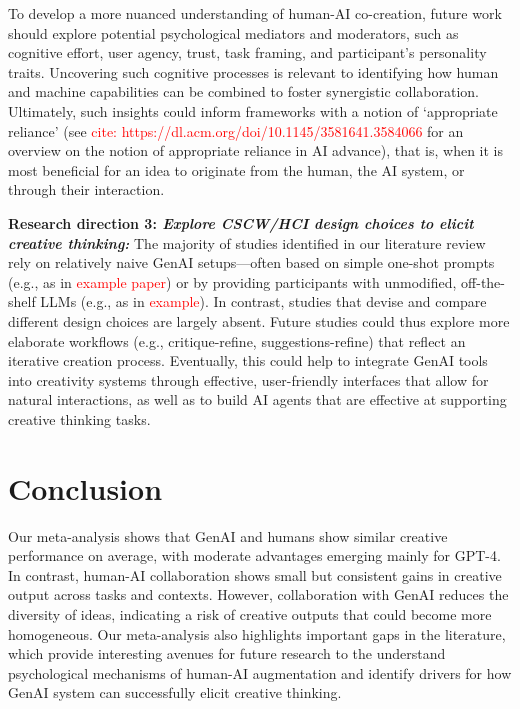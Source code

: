 \documentclass[manuscript, screen, review, acmsmall, anonymous]{acmart}
\newcommand{\TODO}[1]{\textcolor{red}{#1}}
\begin{document}
To develop a more nuanced understanding of human-AI co-creation, future work should explore potential psychological mediators and moderators, such as cognitive effort, user agency, trust, task framing, and participant's personality traits. Uncovering such cognitive processes is relevant to identifying how human and machine capabilities can be combined to foster synergistic collaboration. Ultimately, such insights could inform frameworks with a notion of `appropriate reliance' (see \TODO{cite: https://dl.acm.org/doi/10.1145/3581641.3584066} for an overview on the notion of appropriate reliance in AI advance), that is, when it is most beneficial for an idea to originate from the human, the AI system, or through their interaction.
    
\textbf{Research direction 3: \textit{Explore CSCW/HCI design choices to elicit creative thinking:}} The majority of studies identified in our literature review rely on relatively naive GenAI setups---often based on simple one-shot prompts (e.g., as in \TODO{example paper}) or by providing participants with unmodified, off-the-shelf LLMs (e.g., as in \TODO{example}). In contrast, studies that devise and compare different design choices are largely absent. Future studies could thus explore more elaborate workflows (e.g., critique-refine, suggestions-refine) that reflect an iterative creation process. Eventually, this could help to integrate GenAI tools into creativity systems through effective, user-friendly interfaces that allow for natural interactions, as well as to build AI agents that are effective at supporting creative thinking tasks.



\section{Conclusion}
\label{sec:conclusion}

Our meta-analysis shows that GenAI and humans show similar creative performance on average, with moderate advantages emerging mainly for GPT-4. In contrast, human-AI collaboration shows small but consistent gains in creative output across tasks and contexts. However, collaboration with GenAI reduces the diversity of ideas, indicating a risk of creative outputs that could become more homogeneous. Our meta-analysis also highlights important gaps in the literature, which provide interesting avenues for future research to the understand psychological mechanisms of human-AI augmentation and identify drivers for how GenAI system can successfully elicit creative thinking.
\end{document}
